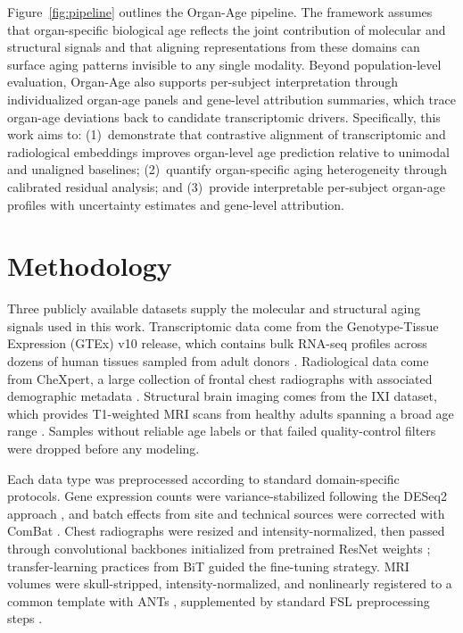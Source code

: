 \documentclass[10pt,twocolumn]{article}
\begin{document}
Figure~\ref{fig:pipeline} outlines the Organ-Age pipeline. The framework assumes that
organ-specific biological age reflects the joint contribution of molecular and structural
signals and that aligning representations from these domains can surface aging patterns
invisible to any single modality. Beyond population-level evaluation, Organ-Age also supports
per-subject interpretation through individualized organ-age panels and gene-level
attribution summaries, which trace organ-age deviations back to candidate transcriptomic
drivers. Specifically, this work aims to: (1)~demonstrate that contrastive alignment of
transcriptomic and radiological embeddings improves organ-level age prediction relative to
unimodal and unaligned baselines; (2)~quantify organ-specific aging heterogeneity through
calibrated residual analysis; and (3)~provide interpretable per-subject organ-age profiles
with uncertainty estimates and gene-level attribution.

\section{Methodology}

Three publicly available datasets supply the molecular and structural aging signals used in
this work. Transcriptomic data come from the Genotype-Tissue Expression (GTEx) v10 release,
which contains bulk RNA-seq profiles across dozens of human tissues sampled from adult donors
\cite{gtex2017}. Radiological data come from CheXpert, a large collection of frontal chest
radiographs with associated demographic metadata \cite{irvin2019chexpert}. Structural brain
imaging comes from the IXI dataset, which provides T1-weighted MRI scans from healthy adults
spanning a broad age range \cite{ixi2020}. Samples without reliable age labels or that failed
quality-control filters were dropped before any modeling.

Each data type was preprocessed according to standard domain-specific protocols. Gene
expression counts were variance-stabilized following the DESeq2 approach \cite{deseq2}, and
batch effects from site and technical sources were corrected with ComBat \cite{combat2007}.
Chest radiographs were resized and intensity-normalized, then passed through convolutional
backbones initialized from pretrained ResNet weights \cite{he2016resnet}; transfer-learning
practices from BiT \cite{kolesnikov2020bit} guided the fine-tuning strategy. MRI volumes
were skull-stripped, intensity-normalized, and nonlinearly registered to a common template
with ANTs \cite{avants2007ants}, supplemented by standard FSL preprocessing steps
\cite{smith2004fsl}.
\end{document}
